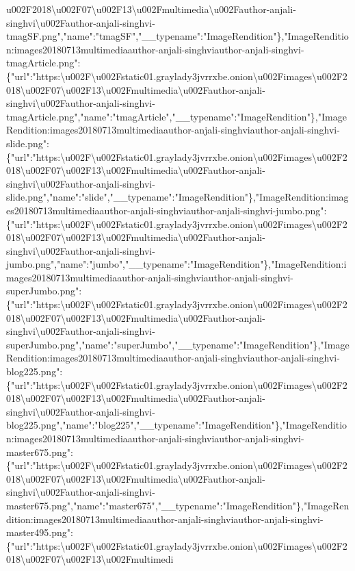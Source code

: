 {}u002F2018\textbackslash{}u002F07\textbackslash{}u002F13\textbackslash{}u002Fmultimedia\textbackslash{}u002Fauthor-anjali-singhvi\textbackslash{}u002Fauthor-anjali-singhvi-tmagSF.png","name":"tmagSF","\_\_typename":"ImageRendition"\},"ImageRendition:images20180713multimediaauthor-anjali-singhviauthor-anjali-singhvi-tmagArticle.png":\{"url":"https:\textbackslash{}u002F\textbackslash{}u002Fstatic01.graylady3jvrrxbe.onion\textbackslash{}u002Fimages\textbackslash{}u002F2018\textbackslash{}u002F07\textbackslash{}u002F13\textbackslash{}u002Fmultimedia\textbackslash{}u002Fauthor-anjali-singhvi\textbackslash{}u002Fauthor-anjali-singhvi-tmagArticle.png","name":"tmagArticle","\_\_typename":"ImageRendition"\},"ImageRendition:images20180713multimediaauthor-anjali-singhviauthor-anjali-singhvi-slide.png":\{"url":"https:\textbackslash{}u002F\textbackslash{}u002Fstatic01.graylady3jvrrxbe.onion\textbackslash{}u002Fimages\textbackslash{}u002F2018\textbackslash{}u002F07\textbackslash{}u002F13\textbackslash{}u002Fmultimedia\textbackslash{}u002Fauthor-anjali-singhvi\textbackslash{}u002Fauthor-anjali-singhvi-slide.png","name":"slide","\_\_typename":"ImageRendition"\},"ImageRendition:images20180713multimediaauthor-anjali-singhviauthor-anjali-singhvi-jumbo.png":\{"url":"https:\textbackslash{}u002F\textbackslash{}u002Fstatic01.graylady3jvrrxbe.onion\textbackslash{}u002Fimages\textbackslash{}u002F2018\textbackslash{}u002F07\textbackslash{}u002F13\textbackslash{}u002Fmultimedia\textbackslash{}u002Fauthor-anjali-singhvi\textbackslash{}u002Fauthor-anjali-singhvi-jumbo.png","name":"jumbo","\_\_typename":"ImageRendition"\},"ImageRendition:images20180713multimediaauthor-anjali-singhviauthor-anjali-singhvi-superJumbo.png":\{"url":"https:\textbackslash{}u002F\textbackslash{}u002Fstatic01.graylady3jvrrxbe.onion\textbackslash{}u002Fimages\textbackslash{}u002F2018\textbackslash{}u002F07\textbackslash{}u002F13\textbackslash{}u002Fmultimedia\textbackslash{}u002Fauthor-anjali-singhvi\textbackslash{}u002Fauthor-anjali-singhvi-superJumbo.png","name":"superJumbo","\_\_typename":"ImageRendition"\},"ImageRendition:images20180713multimediaauthor-anjali-singhviauthor-anjali-singhvi-blog225.png":\{"url":"https:\textbackslash{}u002F\textbackslash{}u002Fstatic01.graylady3jvrrxbe.onion\textbackslash{}u002Fimages\textbackslash{}u002F2018\textbackslash{}u002F07\textbackslash{}u002F13\textbackslash{}u002Fmultimedia\textbackslash{}u002Fauthor-anjali-singhvi\textbackslash{}u002Fauthor-anjali-singhvi-blog225.png","name":"blog225","\_\_typename":"ImageRendition"\},"ImageRendition:images20180713multimediaauthor-anjali-singhviauthor-anjali-singhvi-master675.png":\{"url":"https:\textbackslash{}u002F\textbackslash{}u002Fstatic01.graylady3jvrrxbe.onion\textbackslash{}u002Fimages\textbackslash{}u002F2018\textbackslash{}u002F07\textbackslash{}u002F13\textbackslash{}u002Fmultimedia\textbackslash{}u002Fauthor-anjali-singhvi\textbackslash{}u002Fauthor-anjali-singhvi-master675.png","name":"master675","\_\_typename":"ImageRendition"\},"ImageRendition:images20180713multimediaauthor-anjali-singhviauthor-anjali-singhvi-master495.png":\{"url":"https:\textbackslash{}u002F\textbackslash{}u002Fstatic01.graylady3jvrrxbe.onion\textbackslash{}u002Fimages\textbackslash{}u002F2018\textbackslash{}u002F07\textbackslash{}u002F13\textbackslash{}u002Fmultimedi